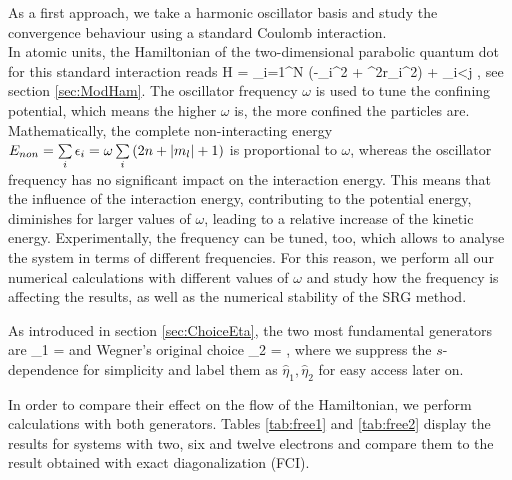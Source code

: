 As a first approach, we take a harmonic oscillator basis and study the convergence behaviour using a standard Coulomb interaction.\\
In atomic units, the Hamiltonian of the two-dimensional parabolic quantum dot for this standard interaction reads
\be 
\hat H = \sum_{i=1}^N \left(-\nabla_i^2 +  \omega^2r_i^2\right) + \sum_{i<j} ,
\ee 
see section \ref{sec:ModHam}.
The oscillator frequency $\omega$ is used to tune the confining
potential, which means the higher $\omega$ is, the more confined
the particles are. Mathematically, the complete non-interacting energy $E_{non} = \sum\limits_i\epsilon_i = \omega\sum\limits_i \left( 2n + |m_l| + 1\right)$ is proportional to $\omega$, whereas the oscillator frequency has no significant impact on the interaction energy. This means that the influence of the interaction energy, contributing to the potential energy, diminishes for larger values of $\omega$, leading to a relative increase of the kinetic energy. Experimentally, the frequency can be tuned, too, which allows to analyse the system in terms of different frequencies. For this reason, we perform all our numerical calculations with different values of $\omega$ and study how the frequency is affecting the results, as well as the numerical stability of the SRG method.

As introduced in section \ref{sec:ChoiceEta}, the two most fundamental generators are 
\be
\hat{\eta}_1 = 
\ee
and Wegner's original choice
\be
 \hat{\eta}_2 = ,
\ee
where we suppress the $s$-dependence for simplicity and label them as $\hat{\eta}_1, \hat{\eta}_2$ for easy access later on. 

In order to compare their effect on the flow of the Hamiltonian, we perform calculations with both generators. Tables \ref{tab:free1} and \ref{tab:free2} display the results for systems with two, six and twelve electrons and compare them to the result obtained with exact diagonalization (FCI).

